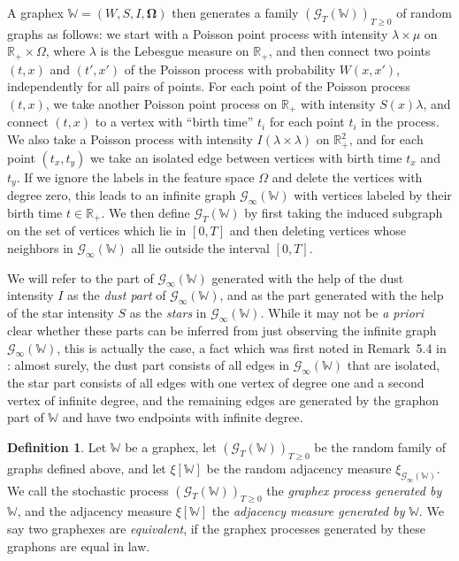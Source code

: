 \documentclass{amsart}
\numberwithin{equation}{section}
\numberwithin{figure}{section}
\theoremstyle{definition}
\newtheorem{definition}[theorem]{Definition}
\theoremstyle{remark}
\newcommand{\bOmega}{{\mathbf{\Omega}}}
\newcommand{\RR}{\mathbb{R}}
\newcommand{\cW}{\mathbb{W}}
\newcommand{\cG}{\mathcal{G}}
\begin{document}
A graphex $\cW=(W,S,I,\bOmega)$ then generates a family $(\cG_T(\cW))_{T\geq
0}$ of random graphs as follows: we start with a Poisson point process with
intensity $\lambda\times\mu$ on $\RR_+\times\Omega$, where $\lambda$ is the
Lebesgue measure on $\RR_+$, and then connect two points $(t,x)$ and
$(t',x')$ of the Poisson process with probability $W(x,x')$, independently
for all pairs of points. For each point of the Poisson process $(t,x)$, we
take another Poisson point process on $\RR_+$ with intensity ${S(x)}\lambda$,
and connect $(t,x)$ to a vertex with ``birth time'' $t_i$ for each point
$t_i$ in the process. We also take a Poisson process with intensity
${I(\lambda\times\lambda)}$ on $\RR_+^{2}$, and for each point $(t_x,t_y)$ we
take an isolated edge between vertices with birth time $t_x$ and $t_y$. If we
ignore the labels in the feature space $\Omega$ and delete the vertices with
degree zero, this leads to an infinite graph $\cG_\infty(\cW)$ with vertices
labeled by their birth time $t\in \RR_+$. We then define $\cG_T(\cW)$ by
first taking the induced subgraph on the set of vertices which lie in $[0,T]$
and then deleting vertices whose neighbors in $\cG_\infty(\cW)$ all lie
outside the interval $[0,T]$.

We will refer to the part of $\cG_\infty(\cW)$ generated with the help of the
dust intensity $I$ as the \emph{dust part} of $\cG_\infty(\cW)$, and as the
part generated with the help of the star intensity $S$ as the \emph{stars} in
$\cG_\infty(\cW)$. While it may not be \emph{a priori} clear whether these
parts can be inferred from just observing the infinite graph
$\cG_\infty(\cW)$, this is actually the case, a fact which was first noted in
Remark~5.4 in \cite{JANSON16}: almost surely, the dust part consists of all
edges in $\cG_\infty(\cW)$ that are isolated, the star part consists of all
edges with one vertex of degree one and a second vertex of infinite degree,
and the remaining edges are generated by the graphon part of $\cW$ and have
two endpoints with infinite degree.

\begin{definition}\label{def:graphex-process}
Let $\cW$ be a graphex, let $(\cG_T(\cW))_{T\geq 0}$ be the random family of
graphs defined above, and let $\xi[\cW]$ be the random adjacency measure
$\xi_{\cG_\infty(\cW)}$. We call the stochastic process $(\cG_T(\cW))_{T\geq
0}$ the \emph{graphex process generated by} $\cW$, and the adjacency measure
$\xi[\cW]$ the \emph{adjacency measure generated by} $\cW$. We say two
graphexes are \emph{equivalent}, if the graphex processes generated by these
graphons are equal in law.
\end{definition}
\end{document}
